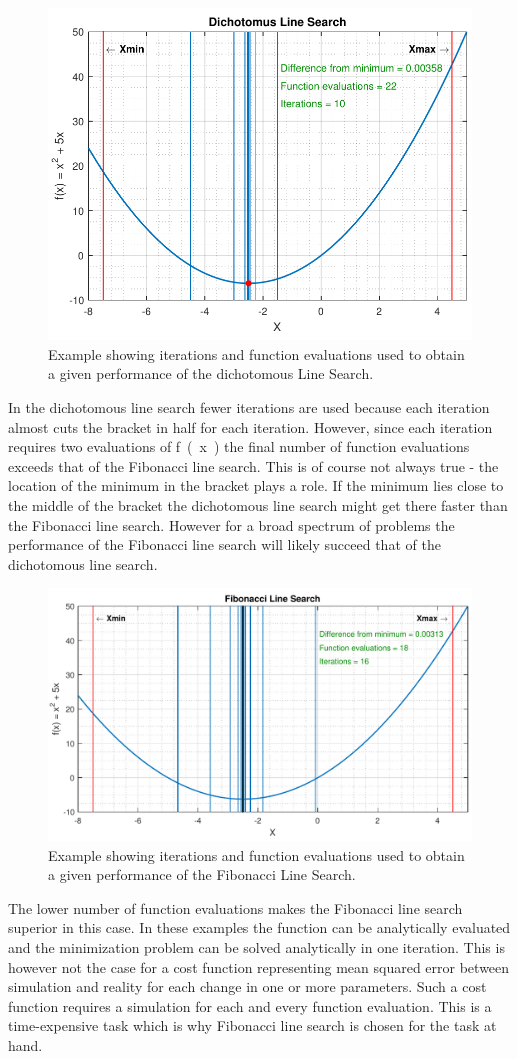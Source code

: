 \begin{figure}[H] 
	\centering
	\includegraphics[width=.65\textwidth]{figures/dichotomousLineSearchPerformance}
	\caption{Example showing iterations and function evaluations used to obtain a given performance of the dichotomous Line Search.}
	\label{dichotomousLineSearchPerformance}
\end{figure}

In the dichotomous line search fewer iterations are used because each iteration almost cuts the bracket in half for each iteration. However, since each iteration requires two evaluations of \si{f(x)} the final number of function evaluations exceeds that of the Fibonacci line search. This is of course not always true - the location of the minimum in the bracket plays a role. If the minimum lies close to the middle of the bracket the dichotomous line search might get there faster than the Fibonacci line search. However for a broad spectrum of problems the performance of the Fibonacci line search will likely succeed that of the dichotomous line search.

\begin{figure}[H] 
	\centering
	\includegraphics[width=.65\textwidth]{figures/fibonacciLineSearchPerformance}
	\caption{Example showing iterations and function evaluations used to obtain a given performance of the Fibonacci Line Search.}
	\label{fibonacciLineSearchPerformance}
\end{figure}

The lower number of function evaluations makes the Fibonacci line search superior in this case. In these examples the function can be analytically evaluated and the minimization problem can be solved analytically in one iteration. This is however not the case for a cost function representing mean squared error between simulation and reality for each change in one or more parameters. Such a cost function requires a simulation for each and every function evaluation. This is a time-expensive task which is why Fibonacci line search is chosen for the task at hand.